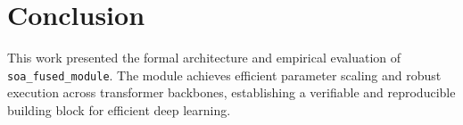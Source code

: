 \section{Conclusion}
This work presented the formal architecture and empirical evaluation of \texttt{soa_fused_module}. The module achieves efficient parameter scaling and robust execution across transformer backbones, establishing a verifiable and reproducible building block for efficient deep learning.
